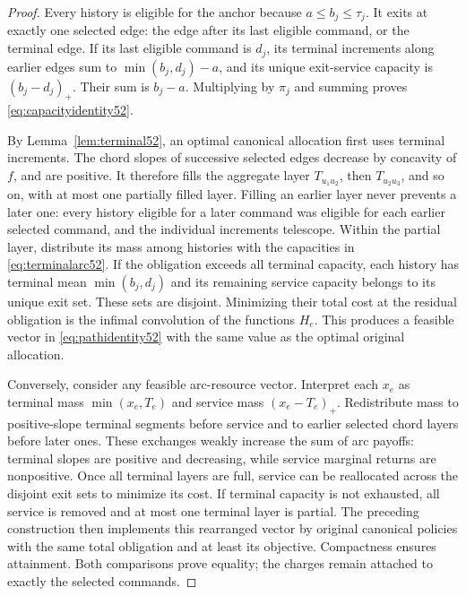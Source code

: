 \begin{proof}
Every history is eligible for the anchor because $a\leq b_j\leq\tau_j$. It exits at exactly one selected edge: the edge after its last eligible command, or the terminal edge. If its last eligible command is $d_j$, its terminal increments along earlier edges sum to $\min(b_j,d_j)-a$, and its unique exit-service capacity is $(b_j-d_j)_+$. Their sum is $b_j-a$. Multiplying by $\pi_j$ and summing proves \eqref{eq:capacityidentity52}.

By Lemma~\ref{lem:terminal52}, an optimal canonical allocation first uses terminal increments. The chord slopes of successive selected edges decrease by concavity of $f$, and are positive. It therefore fills the aggregate layer $T_{u_1u_2}$, then $T_{u_2u_3}$, and so on, with at most one partially filled layer. Filling an earlier layer never prevents a later one: every history eligible for a later command was eligible for each earlier selected command, and the individual increments telescope. Within the partial layer, distribute its mass among histories with the capacities in \eqref{eq:terminalarc52}. If the obligation exceeds all terminal capacity, each history has terminal mean $\min(b_j,d_j)$ and its remaining service capacity belongs to its unique exit set. These sets are disjoint. Minimizing their total cost at the residual obligation is the infimal convolution of the functions $H_e$. This produces a feasible vector in \eqref{eq:pathidentity52} with the same value as the optimal original allocation.

Conversely, consider any feasible arc-resource vector. Interpret each $x_e$ as terminal mass $\min(x_e,T_e)$ and service mass $(x_e-T_e)_+$. Redistribute mass to positive-slope terminal segments before service and to earlier selected chord layers before later ones. These exchanges weakly increase the sum of arc payoffs: terminal slopes are positive and decreasing, while service marginal returns are nonpositive. Once all terminal layers are full, service can be reallocated across the disjoint exit sets to minimize its cost. If terminal capacity is not exhausted, all service is removed and at most one terminal layer is partial. The preceding construction then implements this rearranged vector by original canonical policies with the same total obligation and at least its objective. Compactness ensures attainment. Both comparisons prove equality; the charges remain attached to exactly the selected commands.
\end{proof}

